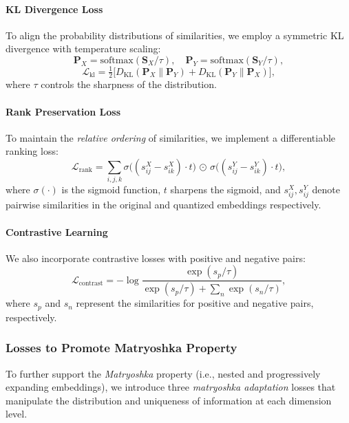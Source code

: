 \paragraph{KL Divergence Loss}
To align the probability distributions of similarities, we employ a symmetric KL divergence with temperature scaling:
\begin{equation}
    \mathbf{P}_X = \text{softmax}(\mathbf{S}_X/\tau), 
    \quad 
    \mathbf{P}_Y = \text{softmax}(\mathbf{S}_Y/\tau),
\end{equation}
\begin{equation}
    \mathcal{L}_{\text{kl}} = \tfrac{1}{2}\bigl[D_{\text{KL}}(\mathbf{P}_X\|\mathbf{P}_Y) + D_{\text{KL}}(\mathbf{P}_Y\|\mathbf{P}_X)\bigr],
\end{equation}
where $\tau$ controls the sharpness of the distribution.

\paragraph{Rank Preservation Loss}
To maintain the \emph{relative ordering} of similarities, we implement a differentiable ranking loss:
\begin{equation}
    \mathcal{L}_{\text{rank}} = \sum_{i,j,k} \sigma \bigl((s_{ij}^X - s_{ik}^X)\cdot t\bigr) 
    \,\odot\, 
    \sigma \bigl((s_{ij}^Y - s_{ik}^Y)\cdot t\bigr),
\end{equation}
where $\sigma(\cdot)$ is the sigmoid function, $t$ sharpens the sigmoid, and $s_{ij}^X, s_{ij}^Y$ denote pairwise similarities in the original and quantized embeddings respectively.

\paragraph{Contrastive Learning}
We also incorporate contrastive losses with positive and negative pairs:
\begin{equation}
    \mathcal{L}_{\text{contrast}} = -\log\frac{\exp(s_p/\tau)}{\exp(s_p/\tau) + \sum_{n}\exp(s_n/\tau)},
\end{equation}
where $s_p$ and $s_n$ represent the similarities for positive and negative pairs, respectively.

\subsubsection{Losses to Promote Matryoshka Property}
\label{subsubsec:adv_info_control}
To further support the \emph{Matryoshka} property (i.e., nested and progressively expanding embeddings), we introduce three \emph{matryoshka adaptation} losses that manipulate the distribution and uniqueness of information at each dimension level.

